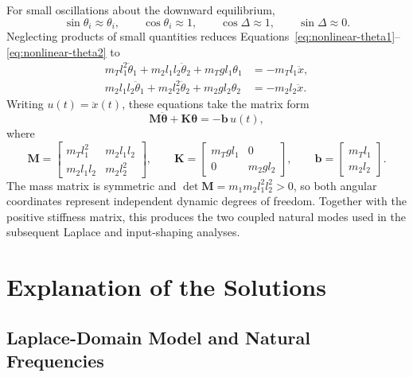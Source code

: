 \documentclass[a4paper,11pt]{article}
\begin{document}
For small oscillations about the downward equilibrium,
\[
    \sin\theta_i\approx\theta_i,\qquad
    \cos\theta_i\approx1,\qquad
    \cos\Delta\approx1,\qquad
    \sin\Delta\approx0.
\]
Neglecting products of small quantities reduces
Equations~\eqref{eq:nonlinear-theta1}--\eqref{eq:nonlinear-theta2} to
\begin{align}
    m_Tl_1^2\ddot{\theta}_1
    +m_2l_1l_2\ddot{\theta}_2
    +m_Tgl_1\theta_1
    &=-m_Tl_1\ddot{x},
    \label{eq:linear-theta1}\\
    m_2l_1l_2\ddot{\theta}_1
    +m_2l_2^2\ddot{\theta}_2
    +m_2gl_2\theta_2
    &=-m_2l_2\ddot{x}.
    \label{eq:linear-theta2}
\end{align}
Writing \(u(t)=\ddot{x}(t)\), these equations take the matrix form
\begin{equation}
    \mathbf M\ddot{\boldsymbol{\theta}}
    +\mathbf K\boldsymbol{\theta}
    =-\mathbf b\,u(t),
    \label{eq:linear-matrix-model}
\end{equation}
where
\begin{equation}
    \mathbf M=
    \begin{bmatrix}
        m_Tl_1^2 & m_2l_1l_2\\
        m_2l_1l_2 & m_2l_2^2
    \end{bmatrix},
    \qquad
    \mathbf K=
    \begin{bmatrix}
        m_Tgl_1 & 0\\
        0 & m_2gl_2
    \end{bmatrix},
    \qquad
    \mathbf b=
    \begin{bmatrix}
        m_Tl_1\\
        m_2l_2
    \end{bmatrix}.
    \label{eq:system-matrices}
\end{equation}
The mass matrix is symmetric and
\(\det\mathbf M=m_1m_2l_1^2l_2^2>0\), so both angular coordinates represent
independent dynamic degrees of freedom. Together with the positive stiffness
matrix, this produces the two coupled natural modes used in the subsequent
Laplace and input-shaping analyses.

\section{Explanation of the Solutions}

\subsection{Laplace-Domain Model and Natural Frequencies}
\end{document}

